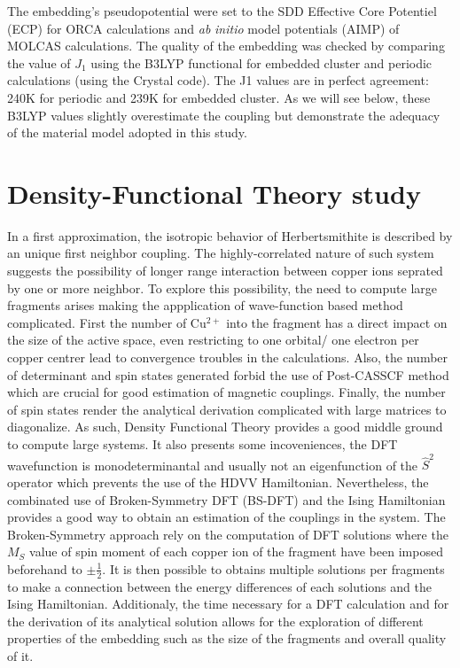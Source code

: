 \documentclass[10pt]{report}
\numberwithin{equation}{section}
\begin{document}
The embedding's pseudopotential were set to the SDD Effective Core Potentiel (ECP) for ORCA calculations and \textit{ab} \textit{initio} model potentials (AIMP) of MOLCAS calculations. 
The quality of the embedding was checked by comparing the value of $J_1$ using the B3LYP functional for embedded cluster and periodic calculations (using the Crystal code). 
The J1 values are in perfect agreement: 240K for periodic and 239K for embedded cluster. 
As we will see below, these B3LYP values slightly overestimate the coupling but demonstrate the adequacy of the material model adopted in this study.

\section{Density-Functional Theory study}

In a first approximation, the isotropic behavior of Herbertsmithite is described by an unique first neighbor coupling. 
The highly-correlated nature of such system suggests the possibility of longer range interaction between copper ions seprated by one or more neighbor. 
To explore this possibility, the need to compute large fragments arises making the appplication of wave-function based method complicated.
First the number of Cu$^{2+}$ into the fragment has a direct impact on the size of the active space, even restricting to one orbital/ one electron per copper centrer lead to convergence troubles in the calculations.
Also, the number of determinant and spin states generated forbid the use of Post-CASSCF method which are crucial for good estimation of magnetic couplings.
Finally, the number of spin states render the analytical derivation complicated with large matrices to diagonalize.
As such, Density Functional Theory provides a good middle ground to compute large systems. 
It also presents some incoveniences, the DFT wavefunction is monodeterminantal and usually not an eigenfunction of the $\hat{S}^2$ operator which prevents the use of the HDVV Hamiltonian.
Nevertheless, the combinated use of Broken-Symmetry DFT (BS-DFT) and the Ising Hamiltonian provides a good way to obtain an estimation of the couplings in the system.
The Broken-Symmetry approach rely on the computation of DFT solutions where the $M_S$ value of spin moment of each copper ion of the fragment have been imposed beforehand to $\pm \frac{1}{2}$. 
It is then possible to obtains multiple solutions per fragments to make a connection between the energy differences of each solutions and the Ising Hamiltonian.
Additionaly, the time necessary for a DFT calculation and for the derivation of its analytical solution allows for the exploration of different properties of the embedding such as the size of the fragments and overall quality of it.
\end{document}
